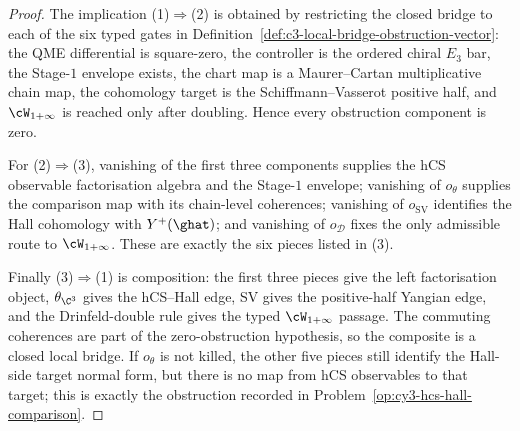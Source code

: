 \begin{proof}
The implication \textup{(1)}$\Rightarrow$\textup{(2)} is obtained by
restricting the closed bridge to each of the six typed gates in
Definition~\ref{def:c3-local-bridge-obstruction-vector}: the QME
differential is square-zero, the controller is the ordered chiral
$E_3$ bar, the Stage-$1$ envelope exists, the chart map is a
Maurer--Cartan multiplicative chain map, the cohomology target is the
Schiffmann--Vasserot positive half, and $\cW_{1+\infty}$ is reached
only after doubling. Hence every obstruction component is zero.

For \textup{(2)}$\Rightarrow$\textup{(3)}, vanishing of the first three
components supplies the hCS observable factorisation algebra and the
Stage-$1$ envelope; vanishing of $o_{\theta}$ supplies the comparison
map with its chain-level coherences; vanishing of $o_{\mathrm{SV}}$
identifies the Hall cohomology with $Y^+(\ghat)$; and vanishing of
$o_{\mathcal D}$ fixes the only admissible route to
$\cW_{1+\infty}$. These are exactly the six pieces listed in
\textup{(3)}.

Finally \textup{(3)}$\Rightarrow$\textup{(1)} is composition: the first
three pieces give the left factorisation object, $\theta_{\C^3}$ gives
the hCS--Hall edge, SV gives the positive-half Yangian edge, and the
Drinfeld-double rule gives the typed $\cW_{1+\infty}$ passage. The
commuting coherences are part of the zero-obstruction hypothesis, so
the composite is a closed local bridge. If $o_{\theta}$ is not killed,
the other five pieces still identify the Hall-side target normal form,
but there is no map from hCS observables to that target; this is exactly
the obstruction recorded in
Problem~\ref{op:cy3-hcs-hall-comparison}.
\end{proof}

